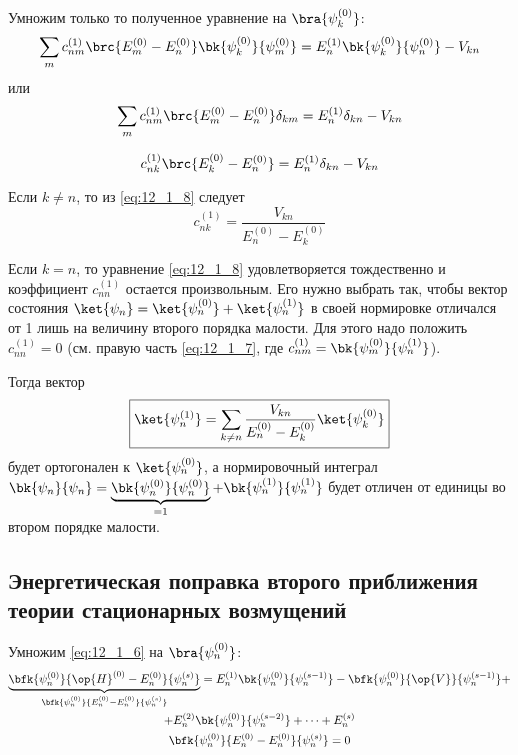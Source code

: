 Умножим только то полученное уравнение на $\bra{\psi_k^{(0)}}$:
$$
\sum_m c_{nm}^{(1)}\brc{E_m^{(0)} - E_n^{(0)}} \bk{\psi_k^{(0)}}{\psi_m^{(0)}} = E_n^{(1)} \bk{\psi_k^{(0)}}{\psi_n^{(0)}} - V_{kn}
$$
или
$$
\sum_m c_{nm}^{(1)}\brc{E_m^{(0)} - E_n^{(0)}} \delta_{km} = E_n^{(1)} \delta_{kn} - V_{kn}
$$

\begin{equation}
\label{eq:12_1_8}
c_{nk}^{(1)} \brc{E_k^{(0)} - E_n^{(0)}} = E_n^{(1)} \delta_{kn} - V_{kn}
\end{equation}

Если $k \neq n$, то из \eqref{eq:12_1_8} следует
\begin{equation}
\label{eq:12_1_9}
c_{nk}^{(1)} = \frac{V_{kn}}{E_n^{(0)} - E_k^{(0)}}
\end{equation}

Если $k = n$, то уравнение \eqref{eq:12_1_8} удовлетворяется тождественно и коэффициент $c_{nn}^{(1)}$ остается произвольным. Его нужно выбрать так, чтобы вектор состояния $\ket{\psi_n} = \ket{\psi_n^{(0)}} + \ket{\psi_n^{(1)}}$ в своей нормировке отличался от 1 лишь на величину второго порядка малости. Для этого надо положить $c_{nn}^{(1)} = 0$ (см. правую часть \eqref{eq:12_1_7}, где $c_{nm}^{(1)} = \bk{\psi_m^{(0)}}{\psi_n^{(1)}}$).

Тогда вектор
\begin{equation}
\label{eq:12_1_10}
\boxed{\ket{\psi_n^{(1)}}= \sum_{k \neq n} \frac{V_{kn}}{E_n^{(0)} - E_k^{(0)}} \ket{\psi_k^{(0)}}}
\end{equation}
будет ортогонален к $\ket{\psi_n^{(0)}}$, а нормировочный интеграл ${\bk{\psi_n}{\psi_n} = \underbrace{\bk{\psi_n^{(0)}}{\psi_n^{(0)}}}_{=1} + \bk{\psi_n^{(1)}}{\psi_n^{(1)}}}$ будет отличен от единицы во втором порядке малости.

\subsection{Энергетическая поправка второго приближения теории стационарных возмущений}

Умножим \eqref{eq:12_1_6} на $\bra{\psi_n^{(0)}}$:
\begin{gather*}
\underbrace{\bfk{\psi_n^{(0)}}{\op{H}^{(0)} - E_n^{(0)}} {\psi_n^{(s)}}}_{\bfk{\psi_n^{(0)}}{E_n^{(0)} - E_n^{(0)}}{\psi_n^{(s)}}} = E_n^{(1)} \bk{\psi_n^{(0)}}{\psi_n^{(s-1)}} - \bfk{\psi_n^{(0)}}{\op{V}}{\psi_n^{(s-1)}} + \\
+ E_n^{(2)}\bk{\psi_n^{(0)}}{\psi_n^{(s-2)}}+\dots+E_n^{(s)}\\
\bfk{\psi_n^{(0)}}{E_n^{(0)} - E_n^{(0)}}{\psi_n^{(s)}} = 0
\end{gather*}

